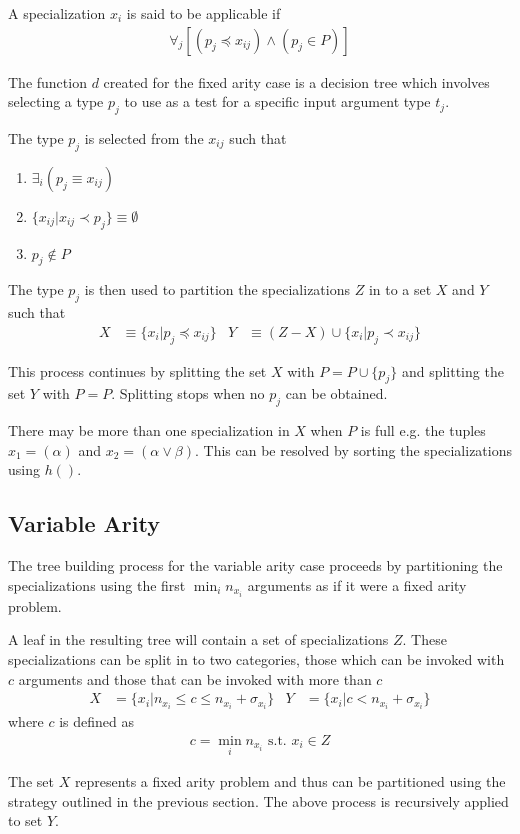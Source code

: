 \documentclass{article}
\begin{document}
A specialization $x_i$ is said to be applicable if
\begin{align}
  \forall_j \left[(p_j \preceq x_{ij}) \land (p_j \in P) \right]
\end{align}

The function $d$ created for the fixed arity case is a decision tree
which involves selecting a type $p_j$ to use as a test for a specific
input argument type $t_j$.

The type $p_j$ is selected from the $x_{ij}$ such that
\begin{enumerate}
\item $\exists_i (p_j \equiv x_{ij})$
\item $\{ x_{ij} | x_{ij} \prec p_j \} \equiv \emptyset$
\item $p_j \notin P$
\end{enumerate}

The type $p_j$ is then used to partition the specializations $Z$ in to
a set $X$ and $Y$ such that
\begin{align}
  X & \equiv \{ x_i | p_j \preceq x_{ij} \} & Y & \equiv (Z - X) \cup \{ x_i | p_j \prec x_{ij} \}
\end{align}

This process continues by splitting the set $X$ with
$P = P \cup \{ p_j \}$ and splitting the set $Y$ with $P =
P$. Splitting stops when no $p_j$ can be obtained.

There may be more than one specialization in $X$ when $P$ is full
e.g. the tuples $x_1 = (\alpha)$ and $x_2 = (\alpha \lor \beta)$. This
can be resolved by sorting the specializations using $h()$.

\subsection{Variable Arity}
The tree building process for the variable arity case proceeds by
partitioning the specializations using the first $\min_i n_{x_i}$
arguments as if it were a fixed arity problem.

A leaf in the resulting tree will contain a set of specializations
$Z$. These specializations can be split in to two categories, those
which can be invoked with $c$ arguments and those that can be invoked
with more than $c$
\begin{align}
  X & = \{ x_i | n_{x_i} \leq c \leq n_{x_i} + \sigma_{x_i} \} & Y &= \{ x_i | c < n_{x_i} + \sigma_{x_i} \}
\end{align}
where $c$ is defined as
\begin{align}
  c = \min_i n_{x_i} \textrm{ s.t. } x_i \in Z
\end{align}

The set $X$ represents a fixed arity problem and thus can be
partitioned using the strategy outlined in the previous section. The
above process is recursively applied to set $Y$.
\end{document}
